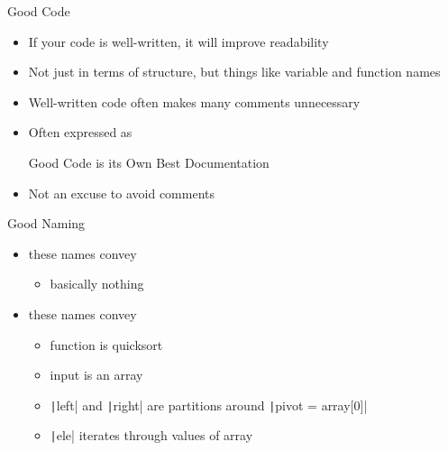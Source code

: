 \begin{frame}{Good Code}
    \begin{itemize}[<+->]
        \item If your code is well-written, it will improve readability
        \item Not just in terms of structure, but things like variable and function names
        \item Well-written code often makes many comments \alert{unnecessary}
        \item Often expressed as
              \begin{block}{}
                  Good Code is its Own Best Documentation
              \end{block}
        \item Not an excuse to avoid comments
    \end{itemize}
\end{frame}

\begin{frame}{Good Naming}
    \begin{multicols}{2}
        \begin{itemize}[<+->]
            \item these names convey
                  \begin{itemize}[<+->]
                      \item basically nothing
                  \end{itemize}
        \end{itemize}
        \vfill\null
        \columnbreak
        \begin{itemize}[<+->]
            \item these names convey
                  \begin{itemize}[<+->]
                      \item function is quicksort
                      \item input is an array
                      \item \texttt|left| and \texttt|right| are partitions around \texttt|pivot = array[0]|
                      \item \texttt|ele| iterates through values of array
                  \end{itemize}
        \end{itemize}
    \end{multicols}
\end{frame}

